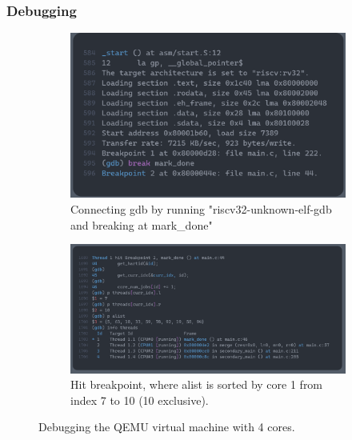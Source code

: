 \subsubsection*{Debugging}
\begin{figure}
  \centering
  \begin{subfigure}[b]{0.45\textwidth}
    \centering
    \includegraphics[width=\textwidth]{./figures/debug1.png}
    \caption{Connecting gdb by running "riscv32-unknown-elf-gdb and breaking at
    mark\_done"}
  \end{subfigure}
  \hfill
  \begin{subfigure}[b]{0.45\textwidth}
    \centering
    \includegraphics[width=\textwidth]{./figures/debug2.png}
    \caption{Hit breakpoint, where alist is sorted by core 1 from
    index 7 to 10 (10 exclusive).}
  \end{subfigure}
  \caption{Debugging the QEMU virtual machine with 4 cores.}\label{fig:debug}
\end{figure}

